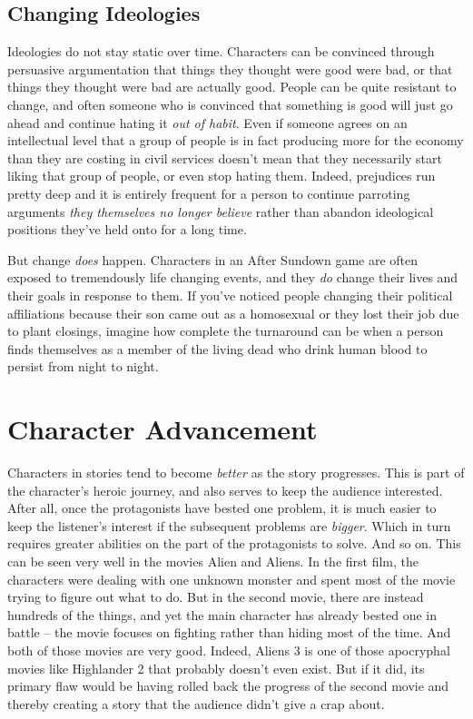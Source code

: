\subsection{Changing Ideologies}

Ideologies do not stay static over time. Characters can be convinced through persuasive argumentation that things they thought were good were bad, or that things they thought were bad are actually good. People can be quite resistant to change, and often someone who is convinced that something is good will just go ahead and continue hating it \textit{out of habit}. Even if someone agrees on an intellectual level that a group of people is in fact producing more for the economy than they are costing in civil services doesn't mean that they necessarily start liking that group of people, or even stop hating them. Indeed, prejudices run pretty deep and it is entirely frequent for a person to continue parroting arguments \textit{they themselves no longer believe} rather than abandon ideological positions they've held onto for a long time.

But change \textit{does} happen. Characters in an After Sundown game are often exposed to tremendously life changing events, and they \textit{do} change their lives and their goals in response to them. If you've noticed people changing their political affiliations because their son came out as a homosexual or they lost their job due to plant closings, imagine how complete the turnaround can be when a person finds themselves as a member of the living dead who drink human blood to persist from night to night.

\section{Character Advancement}

\hspace{\parindent} Characters in stories tend to become \textit{better} as the story progresses. This is part of the character's heroic journey, and also serves to keep the audience interested. After all, once the protagonists have bested one problem, it is much easier to keep the listener's interest if the subsequent problems are \textit{bigger}. Which in turn requires greater abilities on the part of the protagonists to solve. And so on. This can be seen very well in the movies Alien and Aliens. In the first film, the characters were dealing with one unknown monster and spent most of the movie trying to figure out what to do. But in the second movie, there are instead hundreds of the things, and yet the main character has already bested one in battle -- the movie focuses on fighting rather than hiding most of the time. And both of those movies are very good. Indeed, Aliens 3 is one of those apocryphal movies like Highlander 2 that probably doesn't even exist. But if it did, its primary flaw would be having rolled back the progress of the second movie and thereby creating a story that the audience didn't give a crap about.


